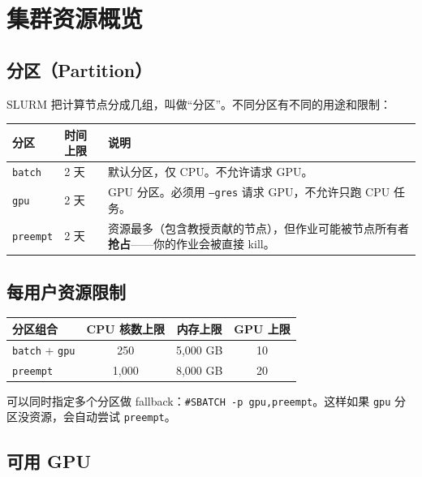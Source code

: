 \section{集群资源概览}

\subsection{分区（Partition）}

SLURM 把计算节点分成几组，叫做``分区''。不同分区有不同的用途和限制：

\begin{table}[h]
\centering
\begin{tabular}{llp{7cm}}
\toprule
分区 & 时间上限 & 说明 \\
\midrule
\texttt{batch} & 2 天 & 默认分区，仅 CPU。不允许请求 GPU。 \\
\texttt{gpu} & 2 天 & GPU 分区。必须用 \texttt{--gres} 请求 GPU，不允许只跑 CPU 任务。 \\
\texttt{preempt} & 2 天 & 资源最多（包含教授贡献的节点），但作业可能被节点所有者\textbf{抢占}——你的作业会被直接 kill。 \\
\bottomrule
\end{tabular}
\end{table}

\subsection{每用户资源限制}

\begin{table}[h]
\centering
\begin{tabular}{lccc}
\toprule
分区组合 & CPU 核数上限 & 内存上限 & GPU 上限 \\
\midrule
\texttt{batch} + \texttt{gpu} & 250 & 5,000 GB & 10 \\
\texttt{preempt} & 1,000 & 8,000 GB & 20 \\
\bottomrule
\end{tabular}
\end{table}

\begin{tipbox}
可以同时指定多个分区做 fallback：\texttt{\#SBATCH -p gpu,preempt}。这样如果 \texttt{gpu} 分区没资源，会自动尝试 \texttt{preempt}。
\end{tipbox}

\subsection{可用 GPU}

